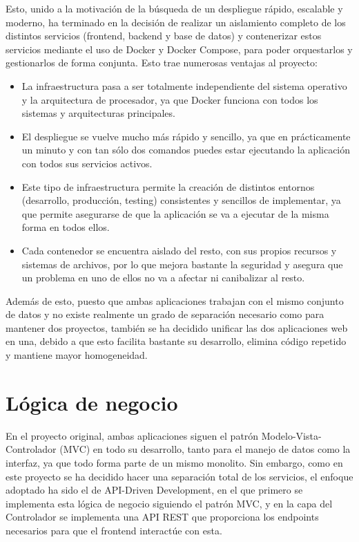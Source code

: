 Esto, unido a la motivación de la búsqueda de un despliegue rápido, escalable y moderno, ha terminado en la decisión de realizar un aislamiento completo de los distintos servicios (frontend, backend y base de datos) y contenerizar estos servicios mediante el uso de Docker y Docker Compose, para poder orquestarlos y gestionarlos de forma conjunta. Esto trae numerosas ventajas al proyecto:

\begin{itemize}
  \item La infraestructura pasa a ser totalmente independiente del sistema operativo y la arquitectura de procesador, ya que Docker funciona con todos los sistemas y arquitecturas principales.
  \item El despliegue se vuelve mucho más rápido y sencillo, ya que en prácticamente un minuto y con tan sólo dos comandos puedes estar ejecutando la aplicación con todos sus servicios activos. 
  \item Este tipo de infraestructura permite la creación de distintos entornos (desarrollo, producción, testing) consistentes y sencillos de implementar, ya que permite asegurarse de que la aplicación se va a ejecutar de la misma forma en todos ellos.
  \item Cada contenedor se encuentra aislado del resto, con sus propios recursos y sistemas de archivos, por lo que mejora bastante la seguridad y asegura que un problema en uno de ellos no va a afectar ni canibalizar al resto.
\end{itemize}

Además de esto, puesto que ambas aplicaciones trabajan con el mismo conjunto de datos y no existe realmente un grado de separación necesario como para mantener dos proyectos, también se ha decidido unificar las dos aplicaciones web en una, debido a que esto facilita bastante su desarrollo, elimina código repetido y mantiene mayor homogeneidad.

\section{Lógica de negocio}

En el proyecto original, ambas aplicaciones siguen el patrón Modelo-Vista-Controlador (MVC) en todo su desarrollo, tanto para el manejo de datos como la interfaz, ya que todo forma parte de un mismo monolito. Sin embargo, como en este proyecto se ha decidido hacer una separación total de los servicios, el enfoque adoptado ha sido el de API-Driven Development, en el que primero se implementa esta lógica de negocio siguiendo el patrón MVC, y en la capa del Controlador se implementa una API REST que proporciona los endpoints necesarios para que el frontend interactúe con esta. 


